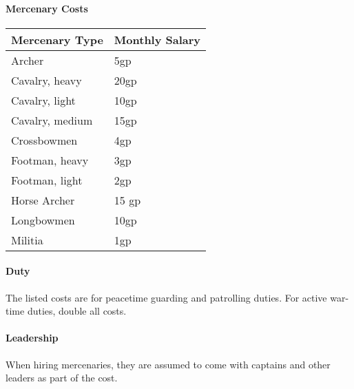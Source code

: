 \paragraph{Mercenary Costs}
\begin{tabular}{l l}
    Mercenary Type & Monthly Salary \\
    \hline
    Archer & 5gp \\
    Cavalry, heavy & 20gp \\
    Cavalry, light & 10gp \\
    Cavalry, medium & 15gp \\
    Crossbowmen & 4gp \\
    Footman, heavy & 3gp \\
    Footman, light & 2gp \\
    Horse Archer & 15 gp \\
    Longbowmen & 10gp \\
    Militia & 1gp \\    
\end{tabular}

\paragraph{Duty} The listed costs are for peacetime guarding and patrolling duties. For active war-time duties, double all costs.

\paragraph{Leadership} When hiring mercenaries, they are assumed to come with captains and other leaders as part of the cost.

